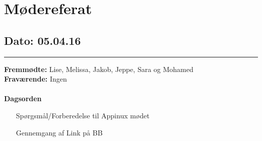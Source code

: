 \chapter{Mødereferat}

\section{Dato: 05.04.16}
\hrule
\textbf{Fremmødte:} Lise, Melissa, Jakob, Jeppe, Sara og Mohamed \\

\textbf{Fraværende:} Ingen
\\
\\
\textbf{Dagsorden}
\begin{itemize}
\item[Spørgsmål/Forberedelse til Appinux mødet]
\item[Gennemgang af Link på BB]
\end{itemize}

